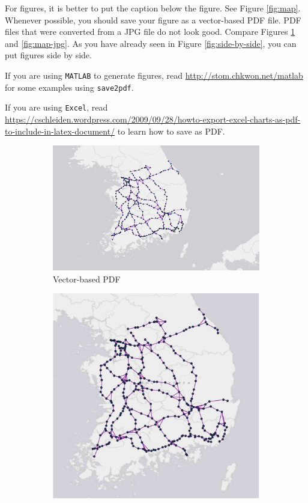\documentclass[letterpaper, 11pt]{article}
\begin{document}
For figures, it is better to put the caption below the figure.
See Figure \ref{fig:map}.
Whenever possible, you should save your figure as a vector-based PDF file.
PDF files that were converted from a JPG file do not look good.
Compare Figures \ref{fig:map-pdf} and \ref{fig:map-jpg}.
As you have already seen in Figure \ref{fig:side-by-side}, you can put figures side by side.

If you are using \texttt{MATLAB} to generate figures, read \url{http://stom.chkwon.net/matlab} for some examples using \texttt{save2pdf}.

If you are using \texttt{Excel}, read \url{https://cschleiden.wordpress.com/2009/09/28/howto-export-excel-charts-as-pdf-to-include-in-latex-document/} to learn how to save as PDF.



\begin{figure} \centering
\begin{subfigure}[b]{0.4\textwidth}
\includegraphics[width=\textwidth]{map}
\caption{Vector-based PDF}
\label{fig:map-pdf}
\end{subfigure}
%
\begin{subfigure}[b]{0.4\textwidth}
\includegraphics[width=\textwidth]{map-jpg}

\end{subfigure}
\end{figure}
\end{document}
